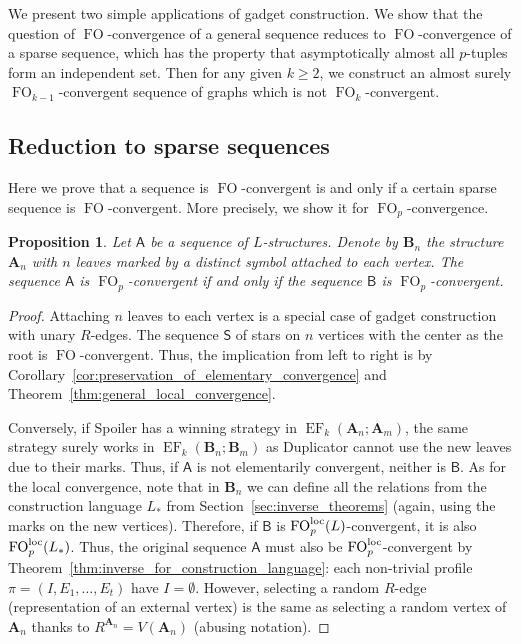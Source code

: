 \documentclass[11pt]{article}
\theoremstyle{plain}
\newtheorem{proposition}[theorem]{Proposition}
\theoremstyle{definition}
\theoremstyle{remark}
\DeclareMathOperator\FO{FO}
\DeclareMathOperator{\EF}{EF}
\newcommand{\FOloc}[1]{\FO_{#1}^\textnormal{loc}}
\newcommand{\str}[1]{\mathbf{#1}}
\newcommand{\strseq}[1]{{\boldsymbol{\mathsf{#1}}}}
\begin{document}
We present two simple applications of gadget construction.
We show that the question of $\FO$-convergence of a general sequence reduces to $\FO$-convergence of a sparse sequence, which has the property that asymptotically almost all $p$-tuples form an independent set.
Then for any given $k \geq 2$, we construct an almost surely $\FO_{k-1}$-convergent sequence of graphs which is not $\FO_k$-convergent.

\subsection{Reduction to sparse sequences}\label{ssec:sparse_sequences}

Here we prove that a sequence is $\FO$-convergent is and only if a certain sparse sequence is $\FO$-convergent.
More precisely, we show it for $\FO_p$-convergence.

\begin{proposition}\label{prop:reduction_to_sparse}
    Let $\strseq{A}$ be a sequence of $L$-structures.
    Denote by $\str{B}_n$ the structure $\str{A}_n$ with $n$ leaves marked by a distinct symbol attached to each vertex.
    The sequence $\strseq{A}$ is $\FO_p$-convergent if and only if the sequence $\strseq{B}$ is $\FO_p$-convergent.
\end{proposition}
\begin{proof}
    Attaching $n$ leaves to each vertex is a special case of gadget construction with unary $R$-edges.
    The sequence $\strseq{S}$ of stars on $n$ vertices with the center as the root is $\FO$-convergent.
    Thus, the implication from left to right is by Corollary~\ref{cor:preservation_of_elementary_convergence} and  Theorem~\ref{thm:general_local_convergence}.
    
    Conversely, if Spoiler has a winning strategy in $\EF_k(\str{A}_n;\str{A}_m)$, the same strategy surely works in $\EF_k(\str{B}_n;\str{B}_m)$ as Duplicator cannot use the new leaves due to their marks.
    Thus, if $\strseq{A}$ is not elementarily convergent, neither is $\strseq{B}$.
    As for the local convergence, note that in $\str{B}_n$ we can define all the relations from the construction language $L_*$ from Section~\ref{sec:inverse_theorems} (again, using the marks on the new vertices).
    Therefore, if $\strseq{B}$ is $\FOloc{p}(L)$-convergent, it is also $\FOloc{p}(L_*)$.
    Thus, the original sequence $\strseq{A}$ must also be $\FOloc{p}$-convergent by Theorem~\ref{thm:inverse_for_construction_language}:
    each non-trivial profile $\pi = (I,E_1, \dots, E_t)$ have $I = \emptyset$.
    However, selecting a random $R$-edge (representation of an external vertex) is the same as selecting a random vertex of $\str{A}_n$ thanks to $R^{\str{A}_n} = V(\str{A}_n)$ (abusing notation).
\end{proof}
\end{document}
